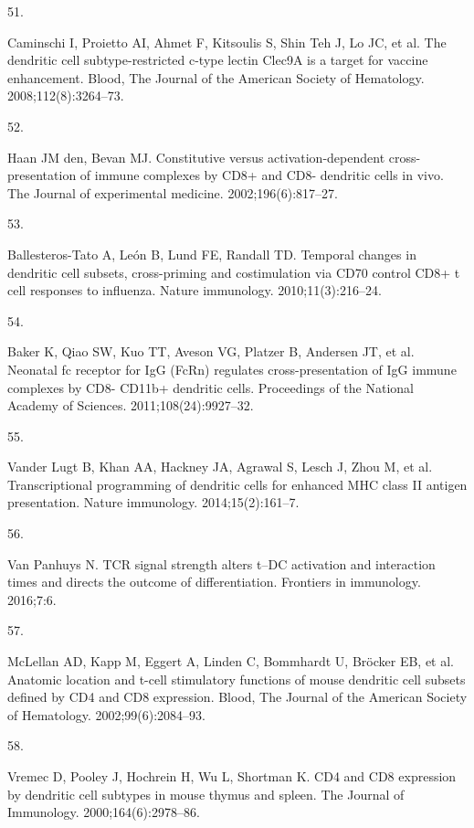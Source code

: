 \documentclass[
]{article}
\newlength{\cslhangindent}
\newlength{\csllabelwidth}
\newenvironment{CSLReferences}[2] %
 {\begin{list}{}{%
  \setlength{\itemindent}{0pt}
  \setlength{\leftmargin}{0pt}
  \setlength{\parsep}{0pt}
  \ifodd #1
   \setlength{\leftmargin}{\cslhangindent}
   \setlength{\itemindent}{-1\cslhangindent}
  \fi
  \setlength{\itemsep}{#2\baselineskip}}}
 {\end{list}}
\newcommand{\CSLLeftMargin}[1]{\parbox[t]{\csllabelwidth}{\strut#1\strut}}
\newcommand{\CSLRightInline}[1]{\parbox[t]{\linewidth - \csllabelwidth}{\strut#1\strut}}
\begin{document}
\begin{CSLReferences}{0}{1}
\CSLLeftMargin{51. }%
\CSLRightInline{Caminschi I, Proietto AI, Ahmet F, Kitsoulis S, Shin Teh
J, Lo JC, et al. The dendritic cell subtype-restricted c-type lectin
Clec9A is a target for vaccine enhancement. Blood, The Journal of the
American Society of Hematology. 2008;112(8):3264--73. }

\CSLLeftMargin{52. }%
\CSLRightInline{Haan JM den, Bevan MJ. Constitutive versus
activation-dependent cross-presentation of immune complexes by CD8+ and
CD8- dendritic cells in vivo. The Journal of experimental medicine.
2002;196(6):817--27. }

\CSLLeftMargin{53. }%
\CSLRightInline{Ballesteros-Tato A, León B, Lund FE, Randall TD.
Temporal changes in dendritic cell subsets, cross-priming and
costimulation via CD70 control CD8+ t cell responses to influenza.
Nature immunology. 2010;11(3):216--24. }

\CSLLeftMargin{54. }%
\CSLRightInline{Baker K, Qiao SW, Kuo TT, Aveson VG, Platzer B, Andersen
JT, et al. Neonatal fc receptor for IgG (FcRn) regulates
cross-presentation of IgG immune complexes by CD8- CD11b+ dendritic
cells. Proceedings of the National Academy of Sciences.
2011;108(24):9927--32. }

\CSLLeftMargin{55. }%
\CSLRightInline{Vander Lugt B, Khan AA, Hackney JA, Agrawal S, Lesch J,
Zhou M, et al. Transcriptional programming of dendritic cells for
enhanced MHC class II antigen presentation. Nature immunology.
2014;15(2):161--7. }

\CSLLeftMargin{56. }%
\CSLRightInline{Van Panhuys N. TCR signal strength alters t--DC
activation and interaction times and directs the outcome of
differentiation. Frontiers in immunology. 2016;7:6. }

\CSLLeftMargin{57. }%
\CSLRightInline{McLellan AD, Kapp M, Eggert A, Linden C, Bommhardt U,
Bröcker EB, et al. Anatomic location and t-cell stimulatory functions of
mouse dendritic cell subsets defined by CD4 and CD8 expression. Blood,
The Journal of the American Society of Hematology. 2002;99(6):2084--93.
}

\CSLLeftMargin{58. }%
\CSLRightInline{Vremec D, Pooley J, Hochrein H, Wu L, Shortman K. CD4
and CD8 expression by dendritic cell subtypes in mouse thymus and
spleen. The Journal of Immunology. 2000;164(6):2978--86. }


\end{CSLReferences}
\end{document}
